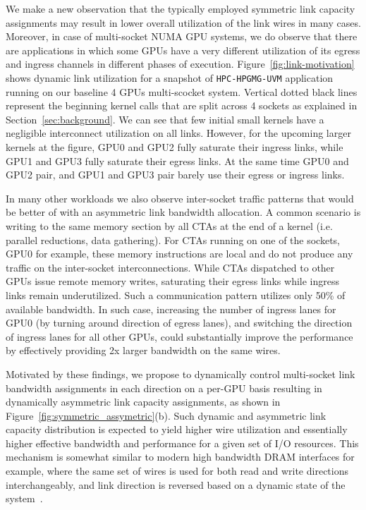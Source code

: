 We make a new observation that the typically employed symmetric link capacity
assignments may result in lower overall utilization of the link wires in many
cases. Moreover, in case of multi-socket NUMA GPU systems, we do observe that
there are applications in which some GPUs have a very different utilization of
its egress and ingress channels in different phases of execution.
Figure~\ref{fig:link-motivation} shows dynamic link utilization for a snapshot
of \texttt{HPC-HPGMG-UVM} application running on our baseline 4 GPUs
multi-scocket system. Vertical dotted black lines represent the beginning
kernel calls that are split across 4 sockets as explained in
Section~\ref{sec:background}. We can see that few initial small kernels have a
negligible interconnect utilization on all links. However, for the upcoming
larger kernels at the figure, GPU0 and GPU2 fully saturate their ingress links,
while GPU1 and GPU3 fully saturate their egress links. At the same time GPU0 
and GPU2 pair, and GPU1 and GPU3 pair barely use their egress or ingress links.

In many other workloads we also observe inter-socket traffic patterns that
would be better of with an asymmetric link bandwidth allocation. A common
scenario is writing to the same memory section by all CTAs at the end of a
kernel (i.e. parallel reductions, data gathering). For CTAs running on one of the
sockets, GPU0 for example, these memory instructions are local and do not
produce any traffic on the inter-socket interconnections. While CTAs dispatched
to other GPUs issue remote memory writes, saturating their egress links while
ingress links remain underutilized. Such a communication pattern utilizes only
50\% of available bandwidth. In such case, increasing the number of ingress lanes for GPU0
(by turning around direction of egress lanes), and switching the direction of
ingress lanes for all other GPUs, could substantially improve the performance
by effectively providing 2x larger bandwidth on the same wires. 

Motivated by these findings, we propose to dynamically control multi-socket
link bandwidth assignments in each direction on a per-GPU basis resulting in
dynamically asymmetric link capacity assignments, as shown in
Figure~\ref{fig:symmetric_assymetric}(b). Such dynamic and asymmetric link
capacity distribution is expected to yield higher wire utilization and
essentially higher effective bandwidth and performance for a given set of I/O
resources. This mechanism is somewhat similar to modern high bandwidth DRAM
interfaces for example,
where the same set of wires is used for both read and write directions
interchangeably, and link direction is reversed based on a dynamic state of the
system~\cite{jedec13-hbm}. 

